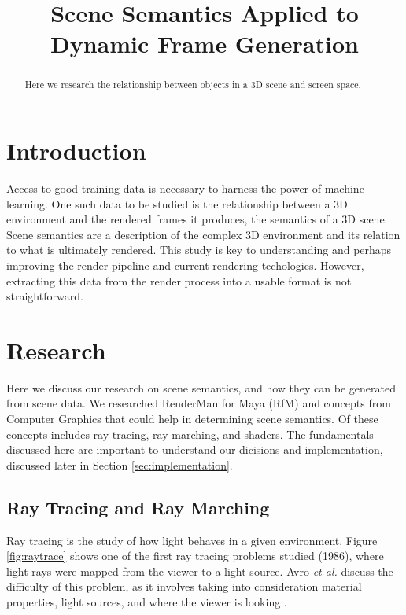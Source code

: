 \documentclass[conference]{IEEEtran}
\begin{document}
\title{Scene Semantics Applied to \\ Dynamic Frame Generation}

\author{
}

\maketitle

\begin{abstract}
Here we research the relationship between objects in a 3D scene and screen space.
\end{abstract}

\section{Introduction}
\label{sec:introduction}
Access to good training data is necessary
to harness the power of machine learning.
One such data to be studied is the relationship
between a 3D environment and the
rendered frames it produces,
the semantics of a 3D scene.
Scene semantics are a description of the complex 3D environment and its
relation to what is ultimately rendered.
This study is key to understanding and perhaps improving the
render pipeline and current rendering techologies.
However, extracting this data from the render process into a usable
format is not straightforward.

\section{Research}
Here we discuss our research on scene semantics, and how they can be generated
from scene data.
We researched RenderMan for Maya (RfM) and concepts from Computer Graphics
that could help in determining scene semantics.
Of these concepts includes ray tracing, ray marching, and shaders.
The fundamentals discussed here are important to understand our dicisions
and implementation, discussed later in Section \ref{sec:implementation}.

\subsection{Ray Tracing and Ray Marching}
Ray tracing is the study of how light behaves in a given environment.
Figure \ref{fig:raytrace}
shows one of the first ray tracing problems studied (1986), where light rays were mapped from
the viewer to a light source. Avro \textit{et al.}
discuss the difficulty of this problem,
as it involves taking into consideration material properties, light sources,
and where the viewer is looking \cite{backwards_raytrace}.
\end{document}
